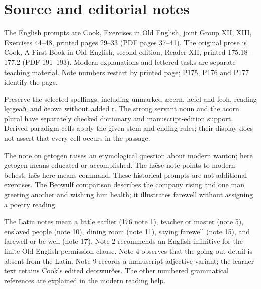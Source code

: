 

\section*{Source and editorial notes}

\begingroup\fontsize{10}{12.8}\selectfont
\setlength{\parskip}{1.5pt}
The English prompts are Cook, Exercises in Old English, joint Group XII, XIII, Exercises 44–48, printed pages 29–33 (PDF pages 37–41). The original prose is Cook, A First Book in Old English, second edition, Reader XII, printed 175.18–177.2 (PDF 191–193). Modern explanations and lettered tasks are separate teaching material. Note numbers restart by printed page; P175, P176 and P177 identify the page.

Preserve the selected spellings, including unmarked æcern, læfel and feoh, reading lęcgeað, and ðēowa without added r. The strong servant noun and the acorn plural have separately checked dictionary and manuscript-edition support. Derived paradigm cells apply the given stem and ending rules; their display does not assert that every cell occurs in the passage.

The note on getogen raises an etymological question about modern wanton; here getogen means educated or accomplished. The hǣse note points to modern behest; hǣs here means command. These historical prompts are not additional exercises. The Beowulf comparison describes the company rising and one man greeting another and wishing him health; it illustrates farewell without assigning a poetry reading.

The Latin notes mean a little earlier (176 note 1), teacher or master (note 5), enslaved people (note 10), dining room (note 11), saying farewell (note 15), and farewell or be well (note 17). Note 2 recommends an English infinitive for the finite Old English permission clause. Note 4 observes that the going-out detail is absent from the Latin. Note 9 records a manuscript adjective variant; the learner text retains Cook’s edited dēorwurðes. The other numbered grammatical references are explained in the modern reading help.

